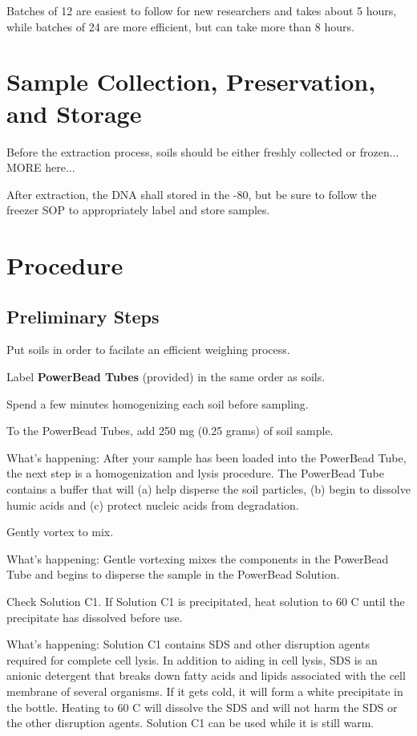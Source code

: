 \documentclass[12pt]{../SOP4_alpha}\usepackage[]{graphicx}\usepackage[]{xcolor}
\begin{document}
\NP Batches of 12 are easiest to follow for new researchers and takes about 5 hours, while batches of 24 are more efficient, but can take more than 8 hours.

\section{Sample Collection, Preservation, and Storage}

\NP Before the extraction process, soils should be either freshly collected or frozen... MORE here...

\NP After extraction, the DNA shall stored in the -80\degree, but be sure to follow the freezer SOP to appropriately label and store samples.

\section{Procedure}

\subsection*{Preliminary Steps} 
 
\NP Put soils in order to facilate an efficient weighing process. 

\NP Label \textbf{PowerBead Tubes} (provided) in the same order as soils.

\NP Spend a few minutes homogenizing each soil before sampling.

\NP To the PowerBead Tubes, add 250 mg (0.25 grams) of soil sample.

\noindent What's happening: After your sample has been loaded into the PowerBead Tube, the next step is a homogenization and lysis procedure. The PowerBead
Tube contains a buffer that will (a) help disperse the soil particles, (b) begin to dissolve humic acids and (c) protect nucleic acids from degradation.

\NP Gently vortex to mix.

\noindent What's happening: Gentle vortexing mixes the components in the PowerBead Tube and begins to disperse the sample in the PowerBead Solution.

\NP Check Solution C1. If Solution C1 is precipitated, heat solution to 60 \degree C until the precipitate has dissolved before use.

\NP What's happening: Solution C1 contains SDS and other disruption agents required for complete cell lysis. In addition to aiding in cell lysis, SDS is an anionic detergent that breaks down fatty acids and lipids associated with the cell membrane of several organisms. If it gets cold, it will form a white precipitate in the bottle. Heating to 60 \degree C will dissolve the SDS and will not harm the SDS or the other disruption agents. Solution C1 can be used while it is still warm.
\end{document}
